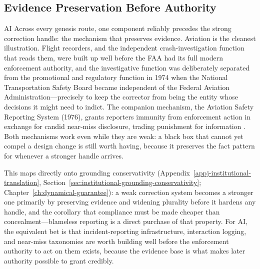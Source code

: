 \begin{refsection}
\section{Evidence Preservation Before Authority}
\label{sec:appm-evidence-before-authority}
\begin{authbar}{AI}
Across every genesis route, one component reliably precedes the strong correction handle: the mechanism that preserves evidence.
Aviation is the cleanest illustration.
Flight recorders, and the independent crash-investigation function that reads them, were built up well before the FAA had its full modern enforcement authority, and the investigative function was deliberately separated from the promotional and regulatory function in 1974 when the National Transportation Safety Board became independent of the Federal Aviation Administration---precisely to keep the corrector from being the entity whose decisions it might need to indict.
The companion mechanism, the Aviation Safety Reporting System (1976), grants reporters immunity from enforcement action in exchange for candid near-miss disclosure, trading punishment for information \autocite{reason1997managingrisks}.
Both mechanisms work even while they are weak: a black box that cannot yet compel a design change is still worth having, because it preserves the fact pattern for whenever a stronger handle arrives.

This maps directly onto grounding conservativity (Appendix~\ref{appj-institutional-translation}, Section~\ref{sec:institutional-grounding-conservativity}; Chapter~\ref{ch:dynamical-guarantee}): a weak correction system becomes a stronger one primarily by preserving evidence and widening plurality before it hardens any handle, and the corollary that compliance must be made cheaper than concealment---blameless reporting is a direct purchase of that property.
For AI, the equivalent bet is that incident-reporting infrastructure, interaction logging, and near-miss taxonomies are worth building well before the enforcement authority to act on them exists, because the evidence base is what makes later authority possible to grant credibly.

\end{authbar}
\authbarneedspace

\end{refsection}
